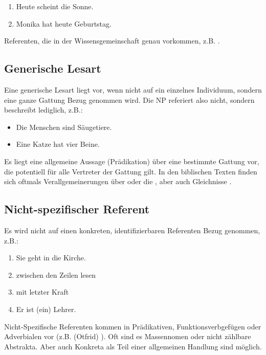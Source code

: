 {\begin{enumerate}
\item Heute scheint die Sonne.
\item Monika hat heute Geburtstag.
\end{enumerate}

\noindent 
{} Referenten, die in der Wissensgemeinschaft genau  vorkommen, z.B. . 


\subsection{Generische Lesart}

Eine generische Lesart liegt vor, wenn nicht auf ein einzelnes Individuum, sondern eine ganze Gattung Bezug genommen wird. Die NP referiert also nicht, sondern beschreibt lediglich, z.B.: 

\begin{itemize}
\item Die Menschen sind Säugetiere.
\item Eine Katze hat vier Beine.
\end{itemize}

\noindent 
{} Es liegt eine allgemeine Aussage (Prädikation) über eine bestimmte Gattung vor, die potentiell für alle Vertreter der Gattung gilt. In den biblischen Texten finden sich oftmals Verallgemeinerungen über  oder die , aber auch Gleichnisse . 

\subsection{Nicht-spezifischer Referent}

Es wird nicht auf einen konkreten, identifizierbaren Referenten Bezug genommen, z.B.: 

\begin{enumerate}
\item Sie geht in die Kirche. 
\item zwischen den Zeilen lesen
\item mit letzter Kraft
\item Er ist (ein) Lehrer.
\end{enumerate}

\noindent
{} Nicht-Spezifische Referenten kommen in Prädikativen, Funktionsverbgefügen oder Adverbialen vor (z.B.  (Otfrid) ). Oft sind es Massennomen oder nicht zählbare Abstrakta. Aber auch Konkreta als Teil einer allgemeinen Handlung sind möglich. 

}
